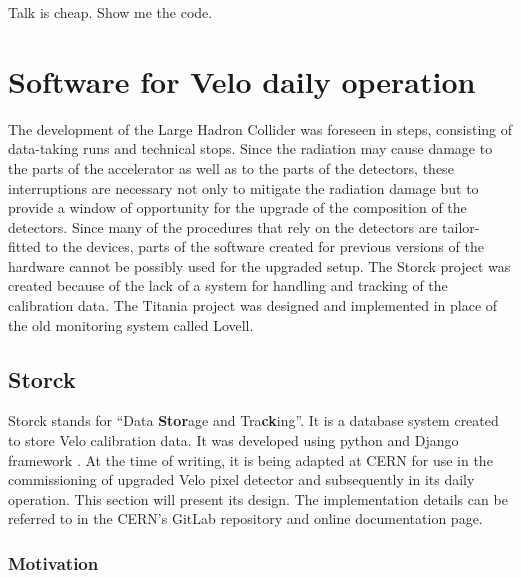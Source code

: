 \begin{savequote}[75mm]
Talk is cheap. Show me the code.
\end{savequote}

\chapter{Software for Velo daily operation}
\label{chap:software}

The development of the Large Hadron Collider was foreseen in steps, consisting of data-taking runs and technical stops.
Since the radiation may cause damage to the parts of the accelerator as well as to the parts of the detectors, these interruptions are necessary not only to mitigate the radiation damage but to provide a window of opportunity for the upgrade of the composition of the detectors.
Since many of the procedures that rely on the detectors are tailor-fitted to the devices, parts of the software created for previous versions of the hardware cannot be possibly used for the upgraded setup.
The Storck project was created because of the lack of a system for handling and tracking of the calibration data. The Titania project was designed and implemented in place of the old monitoring system called Lovell.

\section{Storck}

Storck stands for ``Data \textbf{Stor}age and Tra\textbf{ck}ing''. It is a database system created to store Velo calibration data.
It was developed using python \cite{10.5555/1593511} and Django framework \cite{django}.
At the time of writing, it is being adapted at CERN for use in the commissioning of upgraded Velo pixel detector and subsequently in its daily operation.
This section will present its design.
The implementation details can be referred to in the CERN's GitLab repository \cite{bworld} and online documentation page\cite{storckdock}.

\subsection{Motivation}

